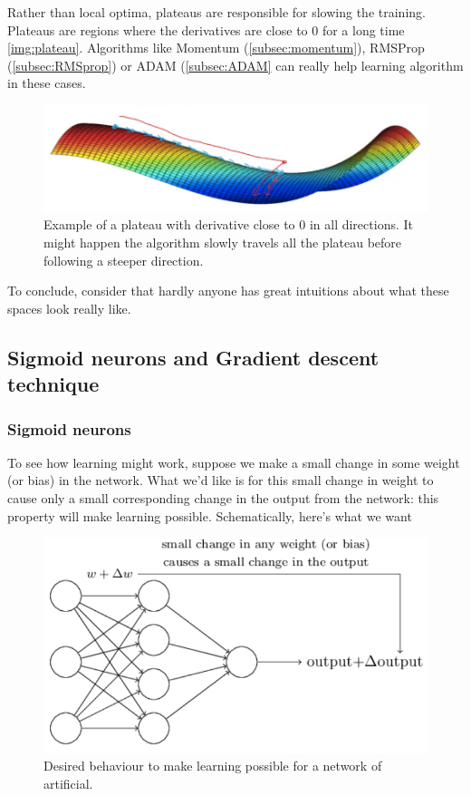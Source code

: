 Rather than local optima, plateaus are responsible for slowing the training. Plateaus are regions where the derivatives are close to $0$ for a long time \autoref{img:plateau}. Algorithms like Momentum (\autoref{subsec:momentum}), RMSProp (\autoref{subsec:RMSprop}) or ADAM (\autoref{subsec:ADAM} can really help learning algorithm in these cases.

\begin{figure}
\centering
\includegraphics[scale=0.4]{img/plateau}
\caption{Example of a plateau with derivative close to $0$ in all directions. It might happen the algorithm slowly travels all the plateau before following a steeper direction.}
\label{img:plateau}
\end{figure}

To conclude, consider that hardly anyone has great intuitions about what these spaces look really like.

\subsection{Sigmoid neurons and Gradient descent technique}
\subsubsection{Sigmoid neurons}
To see how learning might work, suppose we make a small change in some weight (or bias) in the network. What we'd like is for this small change in weight to cause only a small corresponding change in the output from the network: this property will make learning possible. Schematically, here's what we want
\begin{figure}
\centering
\includegraphics[scale=0.4]{img/NNdeltaChange}
\caption{Desired behaviour to make learning possible for a network of artificial.}
\label{NNdeltaChange}
\end{figure}

